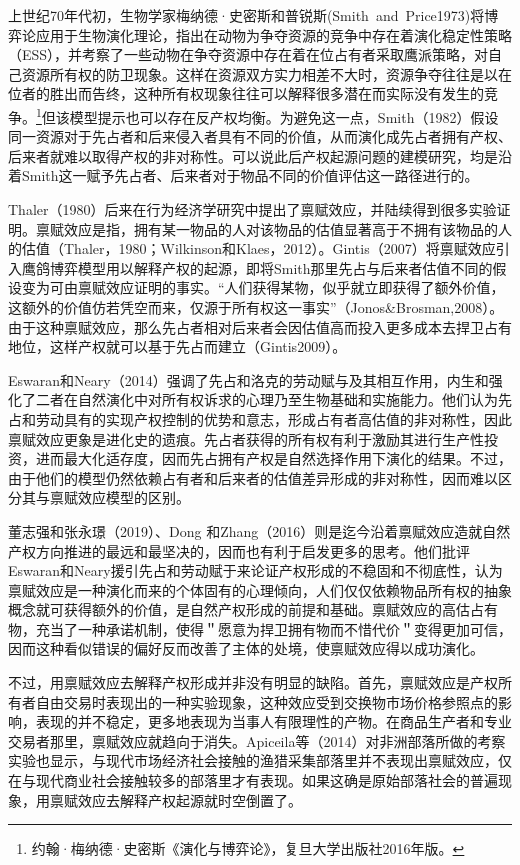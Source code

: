 \documentclass[lang=cn,12pt,a4paper]{elegantpaper}
\begin{document}
上世纪70年代初，生物学家梅纳德·史密斯和普锐斯(Smith~and~Price1973)将博弈论应用于生物演化理论，指出在动物为争夺资源的竞争中存在着演化稳定性策略（ESS），并考察了一些动物在争夺资源中存在着在位占有者采取鹰派策略，对自己资源所有权的防卫现象。这样在资源双方实力相差不大时，资源争夺往往是以在位者的胜出而告终，这种所有权现象往往可以解释很多潜在而实际没有发生的竞争。\footnote{约翰·梅纳德·史密斯《演化与博弈论》，复旦大学出版社2016年版。}但该模型提示也可以存在反产权均衡。为避免这一点，Smith（1982）假设同一资源对于先占者和后来侵入者具有不同的价值，从而演化成先占者拥有产权、后来者就难以取得产权的非对称性。可以说此后产权起源问题的建模研究，均是沿着Smith这一赋予先占者、后来者对于物品不同的价值评估这一路径进行的。

Thaler（1980）后来在行为经济学研究中提出了禀赋效应，并陆续得到很多实验证明。禀赋效应是指，拥有某一物品的人对该物品的估值显著高于不拥有该物品的人的估值（Thaler，1980；Wilkinson和Klaes，2012）。Gintis（2007）将禀赋效应引入鹰鸽博弈模型用以解释产权的起源，即将Smith那里先占与后来者估值不同的假设变为可由禀赋效应证明的事实。``人们获得某物，似乎就立即获得了额外价值，这额外的价值仿若凭空而来，仅源于所有权这一事实''（Jonos\&Brosman,2008）。由于这种禀赋效应，那么先占者相对后来者会因估值高而投入更多成本去捍卫占有地位，这样产权就可以基于先占而建立（Gintis2009）。

Eswaran和Neary（2014）强调了先占和洛克的劳动赋与及其相互作用，内生和强化了二者在自然演化中对所有权诉求的心理乃至生物基础和实施能力。他们认为先占和劳动具有的实现产权控制的优势和意志，形成占有者高估值的非对称性，因此禀赋效应更象是进化史的遗痕。先占者获得的所有权有利于激励其进行生产性投资，进而最大化适存度，因而先占拥有产权是自然选择作用下演化的结果。不过，由于他们的模型仍然依赖占有者和后来者的估值差异形成的非对称性，因而难以区分其与禀赋效应模型的区别。

董志强和张永璟（2019）、Dong 和Zhang（2016）则是迄今沿着禀赋效应造就自然产权方向推进的最远和最坚决的，因而也有利于启发更多的思考。他们批评Eswaran和Neary援引先占和劳动赋于来论证产权形成的不稳固和不彻底性，认为禀赋效应是一种演化而来的个体固有的心理倾向，人们仅仅依赖物品所有权的抽象概念就可获得额外的价值，是自然产权形成的前提和基础。禀赋效应的高估占有物，充当了一种承诺机制，使得＂愿意为捍卫拥有物而不惜代价＂变得更加可信，因而这种看似错误的偏好反而改善了主体的处境，使禀赋效应得以成功演化。

不过，用禀赋效应去解释产权形成并非没有明显的缺陷。首先，禀赋效应是产权所有者自由交易时表现出的一种实验现象，这种效应受到交换物市场价格参照点的影响，表现的并不稳定，更多地表现为当事人有限理性的产物。在商品生产者和专业交易者那里，禀赋效应就趋向于消失。Apiceila等（2014）对非洲部落所做的考察实验也显示，与现代市场经济社会接触的渔猎采集部落里并不表现出禀赋效应，仅在与现代商业社会接触较多的部落里才有表现。如果这确是原始部落社会的普遍现象，用禀赋效应去解释产权起源就时空倒置了。
\end{document}
